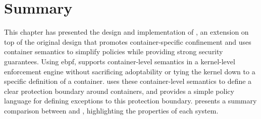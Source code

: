 

\section{Summary}%
\label{s:bpfcontain-summary}

This chapter has presented the design and implementation of \bpfcontain{}, an extension on
top of the original \bpfbox{} design that promotes container-specific confinement and uses
container semantics to simplify policies while providing strong security guarantees.
Using \gls{ebpf}, \bpfcontain{} supports container-level semantics in a kernel-level
enforcement engine without sacrificing adoptability or tying the kernel down to a specific
definition of a container. \bpfcontain{} uses these container-level semantics to define
a clear protection boundary around containers, and provides a simple policy language for
defining exceptions to this protection boundary.  presents
a summary comparison between \bpfbox{} and \bpfcontain{}, highlighting the properties of
each system.


